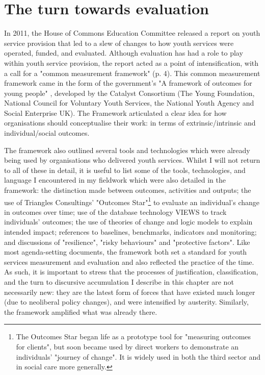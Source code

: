 \section{The turn towards evaluation}
\label{sec:6-2-turn-towards}
In 2011, the House of Commons Education Committee released a report on youth service provision that led to a slew of changes to how youth services were operated, funded, and evaluated. Although evaluation has had a role to play within youth service provision, the \citeyear{house_of_commons_education_committee_services_2011} report acted as a point of intensification, with a call for a "common measurement framework" (p. 4). This common measurement framework came in the form of the government's "A framework of outcomes for young people" \citep{mcneil_framework_2012}, developed by the Catalyst Consortium (The Young Foundation, National Council for Voluntary Youth Services, the National Youth Agency and Social Enterprise UK). The Framework articulated a clear idea for how organisations should conceptualise their work: in terms of extrinsic/intrinsic and individual/social outcomes.

The framework also outlined several tools and technologies which were already being used by organisations who delivered youth services. Whilst I will not return to all of these in detail, it is useful to list some of the tools, technologies, and language I encountered in my fieldwork which were also detailed in the framework: the distinction made between outcomes, activities and outputs; the use of Triangles Consultings' "Outcomes Star"\footnote{The Outcomes Star began life as a prototype tool for "measuring outcomes for clients", but soon became used by direct workers to demonstrate an individuals' "journey of change". It is widely used in both the third sector and in social care more generally.} to evaluate an individual's change in outcomes over time; use of the database technology VIEWS to track individuals' outcomes; the use of theories of change and logic models to explain intended impact; references to baselines, benchmarks, indicators and monitoring; and discussions of "resilience", "risky behaviours" and "protective factors". Like most agenda-setting documents, the framework both set a standard for youth services measurement and evaluation and also reflected the practice of the time. As such, it is important to stress that the processes of justification, classification, and the turn to discursive accumulation I describe in this chapter are not necessarily new: they are the latest form of forces that have existed much longer (due to neoliberal policy changes), and were intensified by austerity. Similarly, the framework amplified what was already there. 

